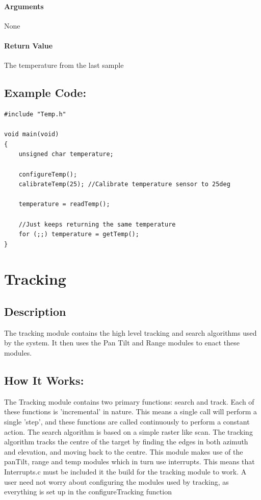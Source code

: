 \documentclass[]{report}
\begin{document}
\subsubsection{Arguments}
None

\subsubsection{Return Value}
The temperature from the last sample

\section{Example Code:}
\begin{lstlisting}
#include "Temp.h"

void main(void)
{
	unsigned char temperature;
	
	configureTemp();
	calibrateTemp(25); //Calibrate temperature sensor to 25deg
	
	temperature = readTemp();
	
	//Just keeps returning the same temperature
	for (;;) temperature = getTemp();
}
\end{lstlisting}

\chapter{Tracking}
\section{Description}
The tracking module contains the high level tracking and search algorithms used by the system. It then uses the Pan Tilt and Range modules to enact these modules.

\section{How It Works:}
The Tracking module contains two primary functions: search and track. Each of these functions is 'incremental' in nature. This means a single call will perform a single 'step', and these functions are called continuously to perform a constant action. \newline
The search algorithm is based on a simple raster like scan. The tracking algorithm tracks the centre of the target by finding the edges in both azimuth and elevation, and moving back to the centre. \newline
This module makes use of the panTilt, range and temp modules which in turn use interrupts. This means that Interrupts.c must be included it the build for the tracking module to work. A user need not worry about configuring the modules used by tracking, as everything is set up in the configureTracking function
\end{document}
